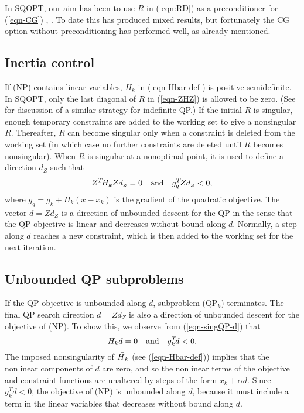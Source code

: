 \documentclass[draft,leqno,onefignum,onetabnum]{siamltex}
\def\Hbar{\skew5\bar H}
\def\T{^T\!}
\def\words#1{\hbox{\quad#1\quad}}
\def\Z{_{\scriptscriptstyle Z}}
\def\gk{g_k}
\def\QPk {QP$_k$}
\def\SQOPT {{\small SQOPT}}
\begin{document}
In \SQOPT{}, our aim has been to use $R$ in (\ref{eqn:RD}) as a
preconditioner for (\ref{eqn-CG})
\cite[pp.\ 151--153]{GilMW81}, \cite{MorN00}.
To date this has produced mixed
results,
but fortunately the CG option without preconditioning has performed
well, as already mentioned.





\subsection{Inertia control}    \label{sec-inertia}

If (NP) contains linear variables, $H_k$ in (\ref{eqn-Hbar-def}) is
positive semi\-definite.  In \SQOPT, only the last diagonal of $R$
in (\ref{eqn-ZHZ}) is allowed to be zero.  (See \cite{GilMSW91} for
discussion of a similar strategy for indefinite QP\@.)
If the initial $R$ is singular, enough temporary
constraints are added to the working set to give a nonsingular $R$.
Thereafter, $R$ can become singular only when a constraint is deleted
from the working set (in which case no further constraints are deleted
until $R$ becomes nonsingular).  When $R$ is singular at a nonoptimal
point, it is used to define a direction $d\Z$ such that
\begin{equation}                                  \label{eqn-singQP-d}
        Z\T H_k Z d\Z = 0  \words{and}   g_q\T Z d\Z < 0,
\end{equation}
where $g_q = g_k + H_k(x-x_k)$ is the gradient of the quadratic
objective.  The vector $d = Zd\Z$ is a direction of unbounded descent
for the QP in the sense that the QP objective is linear and decreases
without bound along $d$.  Normally, a step along $d$ reaches a new
constraint, which is then added to the working set for the next
iteration.


 \subsection{Unbounded QP subproblems} \label{sec-unbounded}

 If the QP objective is unbounded along $d$, subproblem (\QPk)
terminates. The final QP search direction $d = Zd\Z$ is also a
direction of unbounded descent for the objective of (NP)\@.  To show this,
we observe from (\ref{eqn-singQP-d}) that
$$
         H_k d = 0   \words{and}   \gk\T d < 0.
$$
The imposed nonsingularity of $\Hbar_k$ (see (\ref{eqn-Hbar-def})) implies
that the nonlinear components of $d$ are zero, and so the nonlinear
terms of the objective and constraint functions are unaltered by steps
of the form $x_k+\alpha d$.  Since $\gk\T d < 0$, the objective of
(NP) is unbounded along $d$, because it must include a term in the linear
variables that decreases without bound along $d$.
\end{document}
